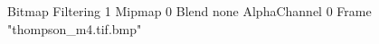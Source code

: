{Bitmap
	{Filtering 1}
	{Mipmap 0}
	{Blend none}
	{AlphaChannel 0}
	{Frame "thompson_m4.tif.bmp"}
}
